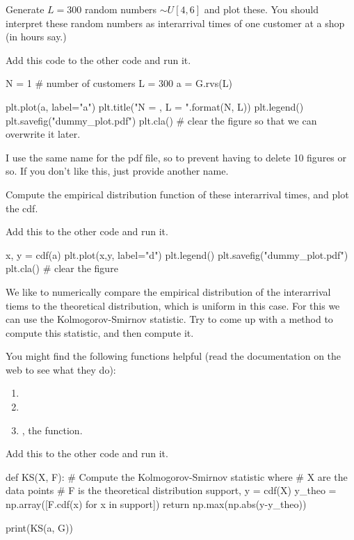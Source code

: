 \documentclass{scrartcl}
\begin{document}
\begin{exercise}
Generate $L=300$ random numbers $\sim U[4,6]$ and plot these. You should interpret these random numbers as interarrival times of one customer at a shop (in hours say.)
\begin{solution}
Add this code to the other code and run it.
\begin{pyverbatim}
N = 1 # number of customers
L = 300
a = G.rvs(L)

plt.plot(a, label="a")
plt.title("N = {}, L = {}".format(N, L))
plt.legend()
plt.savefig("dummy_plot.pdf")
plt.cla() # clear the figure so that we can overwrite it later.
\end{pyverbatim}
I use the same name for the pdf file, so to prevent having to delete 10 figures or so. If you don't like this, just provide another name. 
\end{solution}
\end{exercise}

\begin{exercise}
Compute  the empirical distribution function of these interarrival times, and plot the cdf.
\begin{solution}
Add this to the other code and run it.
\begin{pyverbatim}
x, y = cdf(a)
plt.plot(x,y,  label="d")
plt.legend()
plt.savefig("dummy_plot.pdf")
plt.cla() # clear the figure
\end{pyverbatim}
\end{solution}
\end{exercise}

\begin{exercise}
  We like to numerically compare the empirical distribution of the interarrival tiems to the theoretical distribution, which is uniform in this case. 
For this we can use the Kolmogorov-Smirnov statistic. Try to come up with a method to compute this statistic, and then compute it. 

You might find the following functions helpful (read the documentation on the web to see what they do):
\begin{enumerate}
\item {}
\item {}
\item {}, the  function.
\end{enumerate}

\begin{solution}
Add this to the other code and run it.
\begin{pyverbatim}
def KS(X, F):
    # Compute the Kolmogorov-Smirnov statistic where
    # X are the data points
    # F is the theoretical distribution
    support, y = cdf(X)
    y_theo = np.array([F.cdf(x) for x in support])
    return np.max(np.abs(y-y_theo))

print(KS(a, G))    
\end{pyverbatim}
\end{solution}
\end{exercise}
\end{document}

